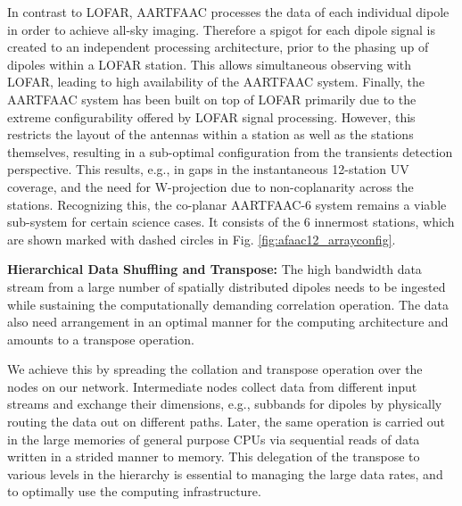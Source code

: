 \documentclass{ws-jai}
\begin{document}
In contrast to  LOFAR, AARTFAAC processes the data of  each individual dipole in
order to achieve  all-sky imaging. Therefore a spigot for  each dipole signal is
created to  an independent processing architecture,  prior to the phasing  up of
dipoles within a LOFAR station.   This allows simultaneous observing with LOFAR,
leading  to high  availability of  the AARTFAAC  system.  Finally,  the AARTFAAC
system  has  been   built  on  top  of  LOFAR  primarily   due  to  the  extreme
configurability offered by LOFAR signal processing.  However, this restricts the
layout of  the antennas  within a  station as well  as the  stations themselves,
resulting  in   a  sub-optimal  configuration  from   the  transients  detection
perspective.  This  results, e.g.,  in gaps in  the instantaneous  12-station UV
coverage,  and the  need  for  W-projection due  to  non-coplanarity across  the
stations.  Recognizing  this, the co-planar  AARTFAAC-6 system remains  a viable
sub-system for certain  science cases. It consists of the  6 innermost stations,
which are shown marked with dashed circles in Fig. \ref{fig:afaac12_arrayconfig}.

\noindent  \textbf  {Hierarchical  Data   Shuffling  and  Transpose:}  The  high
bandwidth data stream from a large number of spatially distributed dipoles needs
to  be  ingested  while  sustaining the  computationally  demanding  correlation
operation. The data also need arrangement in an optimal manner for the computing
architecture and amounts to a transpose operation.

We achieve  this by  spreading the  collation and  transpose operation  over the
nodes  on our  network. Intermediate  nodes  collect data  from different  input
streams and exchange their dimensions,  e.g., subbands for dipoles by physically
routing the  data out on different  paths. Later, the same  operation is carried
out in the large  memories of general purpose CPUs via  sequential reads of data
written  in a  strided manner  to memory.  This delegation  of the  transpose to
various levels in  the hierarchy is essential to managing  the large data rates,
and to optimally use the computing infrastructure.
\end{document}
